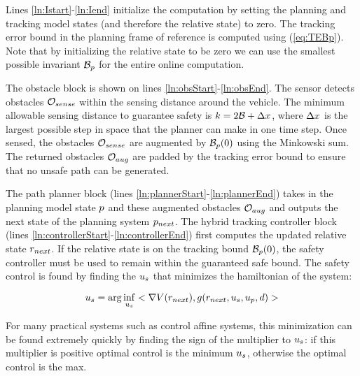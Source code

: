 Lines \ref{ln:Istart}-\ref{ln:Iend} initialize the computation by setting the planning and tracking model states (and therefore the relative state) to zero. The tracking error bound in the planning frame of reference is computed using (\ref{eq:TEBp}). Note that by initializing the relative state to be zero we can use the smallest possible invariant $\mathcal B_p$ for the entire online computation. 

The obstacle block is shown on lines \ref{ln:obsStart}-\ref{ln:obsEnd}. The sensor detects obstacles $\mathcal{O}_{sense}$ within the sensing distance around the vehicle. The minimum allowable sensing distance to guarantee safety is $k = 2\mathcal B + \Delta x$, where $\Delta x$ is the largest possible step in space that the planner can make in one time step.  Once sensed, the obstacles $\mathcal{O}_{sense}$ are augmented by $\mathcal B_p(0)$ using the Minkowski sum. The returned obstacles $\mathcal{O}_{aug}$ are padded by the tracking error bound to ensure that no unsafe path can be generated.


 The path planner block (lines \ref{ln:plannerStart}-\ref{ln:plannerEnd}) takes in the planning model state $p$ and these augmented obstacles $\mathcal{O}_{aug}$ and outputs the next state of the planning system $p_{next}$. The hybrid tracking controller block (lines \ref{ln:controllerStart}-\ref{ln:controllerEnd}) first computes the updated relative state $r_{next}$. If the relative state is on the tracking bound $\mathcal B_p(0)$, the safety controller must be used to remain within the guaranteed safe bound. The safety control is found by finding the $u_s$ that minimizes the hamiltonian of the system:

\begin{equation}
	u_s = \arg\inf_{u_s} <\nabla V(r_{next}),g(r_{next},u_s,u_p,d)>
\end{equation}

For many practical systems such as control affine systems, this minimization can be found extremely quickly by finding the sign of the multiplier to $u_s$: if this multiplier is positive optimal control is the minimum $u_s$, otherwise the optimal control is the max.

